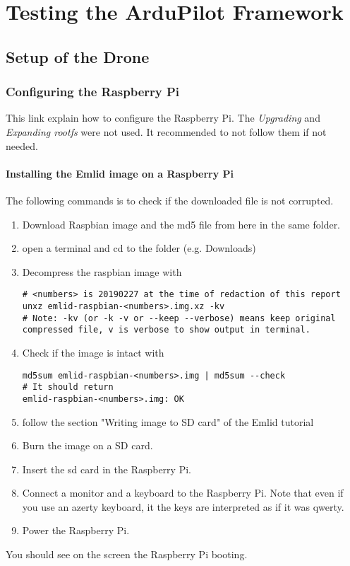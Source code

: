 \chapter{Testing the ArduPilot Framework}

\section{Setup of the Drone}
\subsection{Configuring the Raspberry Pi}
This link \cite{emlid_rpi_config} explain how to configure the Raspberry Pi. The \textit{Upgrading} and \textit{Expanding rootfs} were not used. It recommended to not follow them if not needed.

\subsubsection{Installing the Emlid image on a Raspberry Pi}
The following commands is to check if the downloaded file is not corrupted.

\begin{enumerate}
    \item Download Raspbian image and the md5 file from here \cite{emlid_rpi_config} in the same folder.
    \item open a terminal and cd to the folder (e.g. Downloads)
    \item Decompress the raspbian image with

          \begin{verbatim}
# <numbers> is 20190227 at the time of redaction of this report
unxz emlid-raspbian-<numbers>.img.xz -kv
# Note: -kv (or -k -v or --keep --verbose) means keep original compressed file, v is verbose to show output in terminal.
                    \end{verbatim}

    \item Check if the image is intact with

          \begin{verbatim}
md5sum emlid-raspbian-<numbers>.img | md5sum --check
# It should return
emlid-raspbian-<numbers>.img: OK
                    \end{verbatim}

    \item follow the section "Writing image to SD card" of the Emlid tutorial
    \item Burn the image on a SD card.
    \item Insert the sd card in the Raspberry Pi.
    \item Connect a monitor and a keyboard to the Raspberry Pi. Note that even if you use an azerty keyboard, it the keys are interpreted as if it was qwerty.
    \item Power the Raspberry Pi.
\end{enumerate}
You should see on the screen the Raspberry Pi booting.

